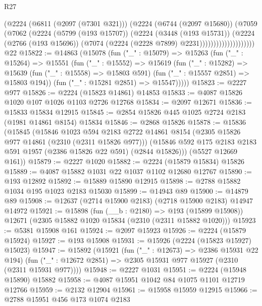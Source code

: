 \begin{lexlean}{R27}
\begin{coremodule}
                          (@2224
                            (@6811 (@2097 (@7301 @321)))
                            (@2224
                              (@6744 (@2097 @15680))
                              (@7059
                                (@7062
                                  (@2224
                                    (@5799 (@193 @15707))
                                    (@2224
                                      (@3448 (@193 @15731))
                                      (@2224
                                        (@2766 (@193 @15696))
                                        (@7074 (@2224 (@2228 @7899) @2231))))))))))))))))))))
    @22
@15822 := @14863
    (@15078
      (fun ("_" : @15079) =>
      @15263
        (fun ("_" : @15264) =>
        @15551
          (fun ("_" : @15552) =>
          @15619
            (fun ("_" : @15282) =>
            @15639 (fun ("_" : @15558) => @15803 @591) (fun ("_" : @15557 @2851) => @15803 @194))
            (fun ("_" : @15281 @2851) => @15547)))))
@15823 := @2227 @977
@15826 := @2224 (@15823 @14861) @14853
@15833 := @4087 @15826 @1020 @107 @1026 @1103 @2726 @12768
@15834 := @2097 @12671
@15836 := @15833 @15834 @12915
@15845 := @2854 @15826 @445 @1025 @2724 @2183 (@1981 @14861 @8154) @15834
@15846 := @2868 @15826
@15878 := @15836
    (@15845
      (@15846
        @1023
        @594
        @2183
        @2722
        @14861
        @8154
        (@2305 @15826 @977 @14861 (@2310 (@2311 @15826 @977)))
        (@15846 @592 @175 @2183 @2183 @591 @1957 (@2386 @15826 @22 @591) (@2844 @15826)))
      (@5527 @12669 @161))
@15879 := @2227 @1020
@15882 := @2224 (@15879 @15834) @15826
@15889 := @4087 @15882 @1031 @22 @1037 @1102 @12680 @12767
@15890 := @193 @12892
@15892 := @15889 @15890 @12915
@15898 := @2788 @15882 @1034 @195 @1023 @2183 @15030
@15899 := @14943 @89
@15900 := @14879 @89
@15908 := @12637 (@2714 @15900 @2183) (@2718 @15900 @2183) @14947 @14972
@15921 := @15898
    (fun (__b : @2180) => @193 (@15899 @15908))
    @12671
    (@2305 @15882 @1020 @15834 (@2310 (@2311 @15882 @1020)))
@15923 := @5381 @15908 @161
@15924 := @2097 @15923
@15926 := @2224 (@15879 @15924)
@15927 := @193 @15908
@15931 := @15926 (@2224 (@15823 @15927) @15023)
@15947 := @15892
    (@15921
      (fun ("_" : @12673) => @2386 @15931 @22 @194)
      (fun ("_" : @12672 @2851) => @2305 @15931 @977 @15927 (@2310 (@2311 @15931 @977))))
@15948 := @2227 @1031
@15951 := @2224 (@15948 @15890) @15882
@15958 := @4087 @15951 @1042 @84 @1075 @1101 @12719 @12766
@15959 := @2132 @12904
@15961 := @15958 @15959 @12915
@15966 := @2788 @15951 @456 @173 @1074 @2183

\end{coremodule}
\end{lexlean}
